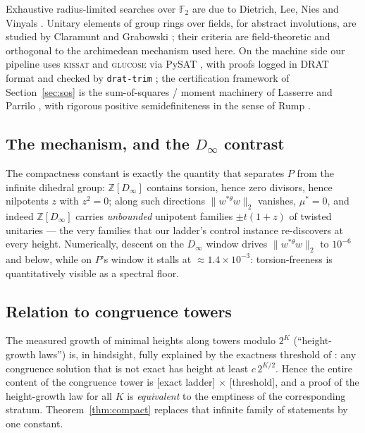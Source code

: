 \documentclass[11pt]{article}
\newcommand{\ZZ}{\mathbb{Z}}
\newcommand{\thst}{{*\theta}}
\begin{document}
Exhaustive radius-limited searches over $\mathbb{F}_2$ are due to
Dietrich, Lee, Nies and Vinyals \cite{DLNV2026}.  Unitary elements of
group rings over fields, for abstract involutions, are studied by
Claramunt and Grabowski \cite{ClaramuntGrabowski2023}; their criteria
are field-theoretic and orthogonal to the archimedean mechanism used
here.  On the machine side our pipeline uses \textsc{kissat}
\cite{kissat} and \textsc{glucose} \cite{glucose} via PySAT
\cite{pysat}, with proofs logged in DRAT format and checked by
\texttt{drat-trim} \cite{DRATtrim}; the certification framework of
Section~\ref{sec:sos} is the sum-of-squares / moment machinery of
Lasserre and Parrilo \cite{Lasserre2001,Parrilo2003}, with rigorous
positive semidefiniteness in the sense of Rump \cite{Rump2006}.

\subsection*{The mechanism, and the $D_\infty$ contrast}

The compactness constant is exactly the quantity that separates $P$
from the infinite dihedral group: $\ZZ[D_\infty]$ contains torsion,
hence zero divisors, hence nilpotents $z$ with $z^2=0$; along such
directions $\|w^{\thst}w\|_2$ vanishes, $\mu^*=0$, and indeed
$\ZZ[D_\infty]$ carries \emph{unbounded} unipotent families
$\pm t(1+z)$ of twisted unitaries --- the very families that our
ladder's control instance re-discovers at every height.  Numerically,
descent on the $D_\infty$ window drives $\|w^{\thst}w\|_2$ to
$10^{-6}$ and below, while on $P$'s window it stalls at
$\approx 1.4\times10^{-3}$: torsion-freeness is quantitatively visible
as a spectral floor.

\subsection*{Relation to congruence towers}

The measured growth of minimal heights along towers modulo $2^K$
(``height-growth laws'') is, in hindsight, fully explained by the
exactness threshold of \cite{paper5}: any congruence solution that is
not exact has height at least $c\,2^{K/2}$.  Hence the entire content
of the congruence tower is [exact ladder] $\times$ [threshold], and a
proof of the height-growth law for all $K$ is \emph{equivalent} to the
emptiness of the corresponding stratum.  Theorem~\ref{thm:compact}
replaces that infinite family of statements by one constant.
\end{document}
